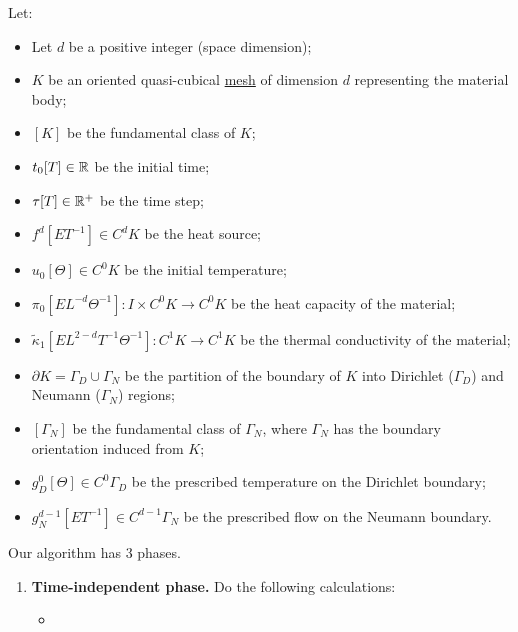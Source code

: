 \begin{algorithm}
  \label{idec/diffusion/discrete/transient/primal_weak_solve_trapezoidal-algorithm}
  Let:
  \begin{itemize}
    \item
      Let $d$ be a positive integer (space dimension);
    \item
      $K$ be an oriented quasi-cubical \hyperref[idec:mesh:definition]{mesh} of
      dimension $d$ representing the material body;
    \item
      $[K]$ be the fundamental class of $K$;
    \item
      $t_0 [T] \in \mathbb{R}$ be the initial time;
    \item
      $\tau [T] \in \mathbb{R}^+$ be the time step;
    \item
      $f^d [E T^{-1}] \in C^d K$ be the heat source;
    \item
      $u_0 [\Theta] \in C^0 K$ be the initial temperature;
    \item
      $\pi_0 [E L^{-d} \Theta^{-1}] \colon I \times C^0 K \to C^0 K$
      be the heat capacity of the material;
    \item
      $\tilde{\kappa}_1 [E L^{2 - d} T^{-1} \Theta^{-1}] \colon C^1 K \to C^1 K$
      be the thermal conductivity of the material;
    \item
      $\partial K = \Gamma_D \cup \Gamma_N$ be the partition of the boundary of
      $K$ into Dirichlet ($\Gamma_D$) and Neumann ($\Gamma_N$) regions;
    \item
      $[\Gamma_N]$ be the fundamental class of $\Gamma_N$, where $\Gamma_N$
      has the boundary orientation induced from $K$;
    \item
      $g_D^0 [\Theta] \in C^0 \Gamma_D$
      be the prescribed temperature on the Dirichlet boundary;
    \item
      $g_N^{d - 1} [E T^{-1}] \in C^{d - 1} \Gamma_N$
      be the prescribed flow on the Neumann boundary.
  \end{itemize}
  Our algorithm has $3$ phases.
  \begin{enumerate}
    \item
      \textbf{Time-independent phase.}
      Do the following calculations:
      \begin{itemize}
        \item

\end{itemize}
\end{enumerate}
\end{algorithm}
